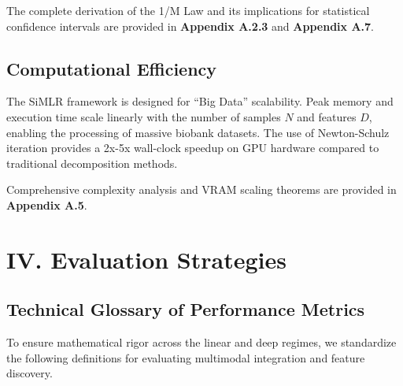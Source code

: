 \documentclass[
  letterpaper,
]{report}
\begin{document}
The complete derivation of the 1/M Law and its implications for
statistical confidence intervals are provided in \textbf{Appendix A.2.3}
and \textbf{Appendix A.7}.

\subsection{Computational Efficiency}\label{computational-efficiency}

The SiMLR framework is designed for ``Big Data'' scalability. Peak
memory and execution time scale linearly with the number of samples
\(N\) and features \(D\), enabling the processing of massive biobank
datasets. The use of Newton-Schulz iteration provides a 2x-5x wall-clock
speedup on GPU hardware compared to traditional decomposition methods.

Comprehensive complexity analysis and VRAM scaling theorems are provided
in \textbf{Appendix A.5}.

\section{IV. Evaluation Strategies}\label{iv.-evaluation-strategies}

\subsection{Technical Glossary of Performance
Metrics}\label{technical-glossary-of-performance-metrics}

To ensure mathematical rigor across the linear and deep regimes, we
standardize the following definitions for evaluating multimodal
integration and feature discovery.
\end{document}
